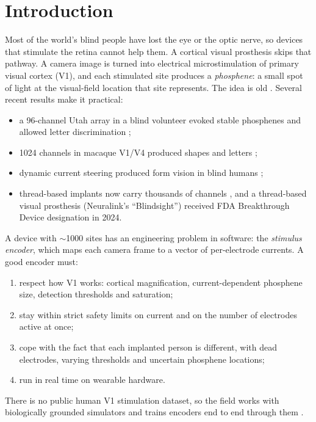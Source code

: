 \section{Introduction}
Most of the world's blind people have lost the eye or the optic nerve, so devices that stimulate the retina cannot help them. A cortical visual prosthesis skips that pathway. A camera image is turned into electrical microstimulation of primary visual cortex (V1), and each stimulated site produces a \emph{phosphene}: a small spot of light at the visual-field location that site represents. The idea is old \citep{dobelle2000artificial,schmidt1996feasibility}. Several recent results make it practical:
\begin{itemize}
\item a 96-channel Utah array in a blind volunteer evoked stable phosphenes and allowed letter discrimination \citep{fernandez2021visual};
\item 1024 channels in macaque V1/V4 produced shapes and letters \citep{chen2020shape};
\item dynamic current steering produced form vision in blind humans \citep{beauchamp2020dynamic};
\item thread-based implants now carry thousands of channels \citep{musk2019integrated}, and a thread-based visual prosthesis (Neuralink's ``Blindsight'') received FDA Breakthrough Device designation in 2024.
\end{itemize}

A device with $\sim$1000 sites has an engineering problem in software: the \emph{stimulus encoder}, which maps each camera frame to a vector of per-electrode currents. A good encoder must:
\begin{enumerate}
\item respect how V1 works: cortical magnification, current-dependent phosphene size, detection thresholds and saturation;
\item stay within strict safety limits on current and on the number of electrodes active at once;
\item cope with the fact that each implanted person is different, with dead electrodes, varying thresholds and uncertain phosphene locations;
\item run in real time on wearable hardware.
\end{enumerate}
There is no public human V1 stimulation dataset, so the field works with biologically grounded simulators \citep{vandergrinten2024towards,beyeler2017pulse2percept} and trains encoders end to end through them \citep{deruyter2022end,granley2022hybrid}.

